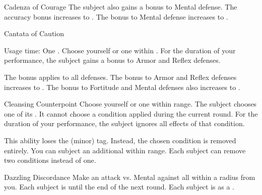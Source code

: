 {\begin{durationability}{Cadenza of Courage}
                \rankline
                 The subject also gains a  bonus to Mental defense.
                 The accuracy bonus increases to .
                 The bonus to Mental defense increases to .
            \end{durationability}

            \begin{durationability}{Cantata of Caution}
                \par \noindent Usage time: One .
                \rankline
                Choose yourself or one  within \medrange.
                For the duration of your performance, the subject gains a  bonus to Armor and Reflex defenses.

                \rankline
                 The bonus applies to all defenses.
                 The bonus to Armor and Reflex defenses increases to .
                 The bonus to Fortitude and Mental defenses also increases to .
            \end{durationability}

            \begin{durationability}{Cleansing Counterpoint}
                \rankline
                Choose yourself or one  within \rngmed range.
                The subject chooses one of its .
                It cannot choose a condition applied during the current round.
                For the duration of your performance, the subject ignores all effects of that condition.

                \rankline
                 This ability loses the  (minor) tag.
                    Instead, the chosen condition is removed entirely.
                 You can subject an additional  within range.
                 Each subject can remove two conditions instead of one.
            \end{durationability}

            \begin{durationability}{Dazzling Discordance}
                \rankline
                Make an attack vs. Mental against all  within a \areamed radius from you.
                \hit Each subject is \dazzled until the end of the next round.
                \crit Each subject is \dazzled as a .


\end{durationability}}
